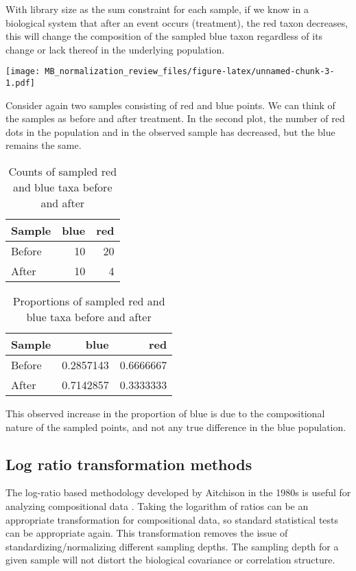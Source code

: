 \documentclass[
]{book}
\begin{document}
With library size as the sum constraint for each sample, if we know in a biological system that after an event occurs (treatment), the red taxon decreases, this will change the composition of the sampled blue taxon regardless of its change or lack thereof in the underlying population.

\texttt{[image: MB\_normalization\_review\_files/figure-latex/unnamed-chunk-3-1.pdf]}

Consider again two samples consisting of red and blue points. We can think of the samples as before and after treatment. In the second plot, the number of red dots in the population and in the observed sample has decreased, but the blue remains the same.

\begin{table}

\caption{\label{tab:unnamed-chunk-4}Counts of sampled red and blue taxa before and after}
\centering
\begin{tabular}[t]{l|r|r}
\hline
Sample & blue & red\\
\hline
Before & 10 & 20\\
\hline
After & 10 & 4\\
\hline
\end{tabular}
\end{table}

\begin{table}

\caption{\label{tab:unnamed-chunk-4}Proportions of sampled red and blue taxa before and after}
\centering
\begin{tabular}[t]{l|r|r}
\hline
Sample & blue & red\\
\hline
Before & 0.2857143 & 0.6666667\\
\hline
After & 0.7142857 & 0.3333333\\
\hline
\end{tabular}
\end{table}

This observed increase in the proportion of blue is due to the compositional nature of the sampled points, and not any true difference in the blue population.

\hypertarget{log-ratio-transformation-methods}{%
\subsection{Log ratio transformation methods}\label{log-ratio-transformation-methods}}

The log-ratio based methodology developed by Aitchison in the 1980s is useful for analyzing compositional data \citep{aitchison1982}. Taking the logarithm of ratios can be an appropriate transformation for compositional data, so standard statistical tests can be appropriate again. This transformation removes the issue of standardizing/normalizing different sampling depths. The sampling depth for a given sample will not distort the biological covariance or correlation structure.
\end{document}
